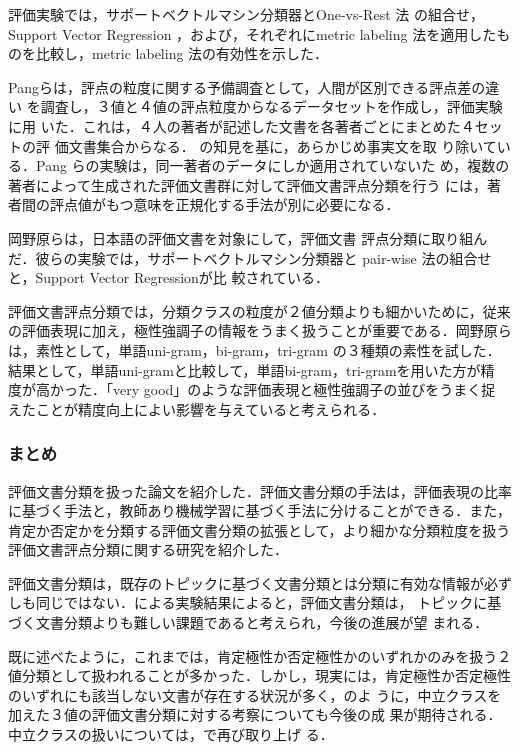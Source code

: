 評価実験では，サポートベクトルマシン分類器とOne-vs-Rest 法
\cite{rifkin2004a}の組合せ，Support Vector Regression \cite{smola1998a} 
，および，それぞれにmetric labeling 法を適用したものを比較し，metric
labeling 法の有効性を示した．

Pangらは，評点の粒度に関する予備調査として，人間が区別できる評点差の違い
を調査し，３値と４値の評点粒度からなるデータセットを作成し，評価実験に用
いた．これは，４人の著者が記述した文書を各著者ごとにまとめた４セットの評
価文書集合からなる．\cite{pang2004a} の知見を基に，あらかじめ事実文を取
り除いている．Pang らの実験は，同一著者のデータにしか適用されていないた
め，複数の著者によって生成された評価文書群に対して評価文書評点分類を行う
には，著者間の評点値がもつ意味を正規化する手法が別に必要になる．

\vspace{1em}
\underline{\textbf{\cite{okanohara2005a}}}
\vspace{1em}

岡野原ら\cite{okanohara2005a}は，日本語の評価文書を対象にして，評価文書
評点分類に取り組んだ．彼らの実験では，サポートベクトルマシン分類器と
pair-wise 法\cite{kresel1999a}の組合せと，Support Vector Regressionが比
較されている．

評価文書評点分類では，分類クラスの粒度が２値分類よりも細かいために，従来
の評価表現に加え，極性強調子の情報をうまく扱うことが重要である．岡野原ら
は，素性として，単語uni-gram，bi-gram，tri-gram の３種類の素性を試した．
結果として，単語uni-gramと比較して，単語bi-gram，tri-gramを用いた方が精
度が高かった．「very good」のような評価表現と極性強調子の並びをうまく捉
えたことが精度向上によい影響を与えていると考えられる．

\subsubsection{まとめ}

評価文書分類を扱った論文を紹介した．評価文書分類の手法は，評価表現の比率
に基づく手法と，教師あり機械学習に基づく手法に分けることができる．また，
肯定か否定かを分類する評価文書分類の拡張として，より細かな分類粒度を扱う
評価文書評点分類に関する研究を紹介した．

評価文書分類は，既存のトピックに基づく文書分類とは分類に有効な情報が必ず
しも同じではない．\cite{pang2002a}による実験結果によると，評価文書分類は，
トピックに基づく文書分類よりも難しい課題であると考えられ，今後の進展が望
まれる．

既に述べたように，これまでは，肯定極性か否定極性かのいずれかのみを扱う２
値分類として扱われることが多かった．しかし，現実には，肯定極性か否定極性
のいずれにも該当しない文書が存在する状況が多く，\cite{koppel2005a}のよ
うに，中立クラスを加えた３値の評価文書分類に対する考察についても今後の成
果が期待される．中立クラスの扱いについては，で再び取り上げ
る．


